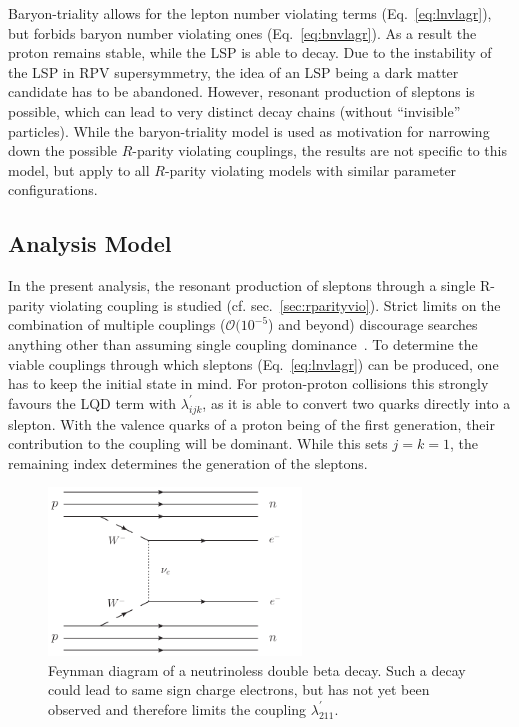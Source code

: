 Baryon-triality allows for the lepton number violating terms (Eq.~\ref{eq:lnvlagr}), but forbids baryon number violating ones (Eq.~\ref{eq:bnvlagr}). As a result the proton remains stable, while the LSP is able to decay. Due to the instability of the LSP in RPV supersymmetry, the idea of an LSP being a dark matter candidate has to be abandoned. However, resonant production of sleptons is possible, which can lead to very distinct decay chains (without ``invisible'' particles). While the baryon-triality model is used as motivation for narrowing down the possible $R$-parity violating couplings, the results are not specific to this model, but apply to all $R$-parity violating models with similar parameter configurations.


\subsection{Analysis Model}
\label{sec:anamodel}

In the present analysis, the resonant production of sleptons through a single R-parity violating coupling is studied (cf. sec.~\ref{sec:rparityvio}). Strict limits on the combination of multiple couplings ($\mathcal{O}(10^{-5}$) and beyond) discourage searches anything other than assuming single coupling dominance~\cite{rpvimpl}. To determine the viable couplings through which sleptons (Eq.~\ref{eq:lnvlagr}) can be produced, one has to keep the initial state in mind. For proton-proton collisions this strongly favours the LQD term with $\lambda^\prime_{ijk}$, as it is able to convert two quarks directly into a slepton. With the valence quarks of a proton being of the first generation, their contribution to the coupling will be dominant. While this sets $j = k = 1$, the remaining index determines the generation of the sleptons. 


\begin{figure}[ht!]
  \centering
  \includegraphics[width=0.6\textwidth]{plots/neutrinoless-double-beta.pdf}  
  \caption{Feynman diagram of a neutrinoless double beta decay. Such a decay could lead to same sign charge electrons, but has not yet been observed and therefore limits the coupling $\lambda^\prime_{211}$.}
  \label{fig:neutrinoless-double-beta}
\end{figure}


